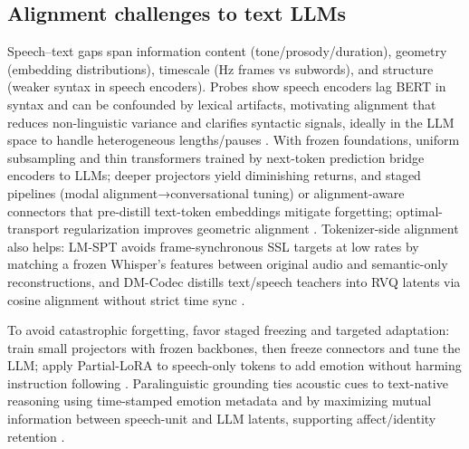 \subsection{Alignment challenges to text LLMs} \label{subsec:Alignment challenges to text LLMs}
Speech–text gaps span information content (tone/prosody/duration), geometry (embedding distributions), timescale (Hz frames vs subwords), and structure (weaker syntax in speech encoders). Probes show speech encoders lag BERT in syntax and can be confounded by lexical artifacts, motivating alignment that reduces non-linguistic variance and clarifies syntactic signals, ideally in the LLM space to handle heterogeneous lengths/pauses \cite{shen2023wavesyntaxprobingspokenlanguagemodels,xu2025optimaltransportregularizationspeechtext}. With frozen foundations, uniform subsampling and thin transformers trained by next-token prediction bridge encoders to LLMs; deeper projectors yield diminishing returns, and staged pipelines (modal alignment→conversational tuning) or alignment-aware connectors that pre-distill text-token embeddings mitigate forgetting; optimal-transport regularization improves geometric alignment \cite{wang2023slmbridgethingapbetweenspeechtextfoundat,shu2023llasmlargelanguagespeechmodel,tan2025ssralignmentawaremodalityconnectorspeech,xu2025optimaltransportregularizationspeechtext}. Tokenizer-side alignment also helps: LM-SPT avoids frame-synchronous SSL targets at low rates by matching a frozen Whisper’s features between original audio and semantic-only reconstructions, and DM-Codec distills text/speech teachers into RVQ latents via cosine alignment without strict time sync \cite{jo2025lmsptalignedsemanticdistillationspeechto,ahasan2025dmcodecdistillingmultimodalrepresentatio}.

To avoid catastrophic forgetting, favor staged freezing and targeted adaptation: train small projectors with frozen backbones, then freeze connectors and tune the LLM; apply Partial-LoRA to speech-only tokens to add emotion without harming instruction following \cite{wang2023slmbridgethingapbetweenspeechtextfoundat,tan2025ssralignmentawaremodalityconnectorspeech,wang2024blspemotowardsempatheticlargespeechlangu}. Paralinguistic grounding ties acoustic cues to text-native reasoning using time-stamped emotion metadata and by maximizing mutual information between speech-unit and LLM latents, supporting affect/identity retention \cite{wang2025incorporatingcontextualparalinguisticund,wang2025bossbeyondsemanticspeech}.

